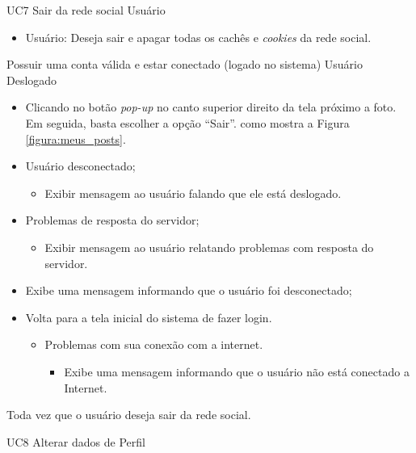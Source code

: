 \casoDeUso
{UC7}
{Sair da rede social}
{Usuário}
{
\begin{itemize}
	\item Usuário: Deseja sair e apagar todas os cachês e \textit{cookies} da rede social.
\end{itemize}
}
{Possuir uma conta válida e estar conectado (logado no sistema)}
{Usuário Deslogado}
{
\begin{itemize}
	\item Clicando no botão  \textit{pop-up} no canto superior direito da tela próximo a foto. Em seguida, basta escolher a opção “Sair”.  como mostra a Figura  \ref{figura:meus_posts}.
\end{itemize}
}
{
\begin{itemize}
	\item Usuário desconectado;
		\begin{itemize}
		\item Exibir mensagem  ao usuário falando que ele está deslogado.
		\end{itemize}
	\item Problemas de resposta do servidor;
		\begin{itemize}
		\item Exibir mensagem  ao usuário relatando problemas com resposta do servidor.
		\end{itemize}
	\item Exibe uma mensagem informando que o usuário foi desconectado;
	\item Volta para a tela inicial do sistema de fazer login.
		\begin{itemize}
		\item Problemas com sua conexão com a internet.
			\begin{itemize}
			\item Exibe uma mensagem informando que o usuário não está conectado a Internet.
			\end{itemize}
		\end{itemize}
	
\end{itemize}
}
{Toda vez que o usuário deseja sair da rede social.}
{

}
\casoDeUso
{UC8}
{Alterar dados de Perfil}
